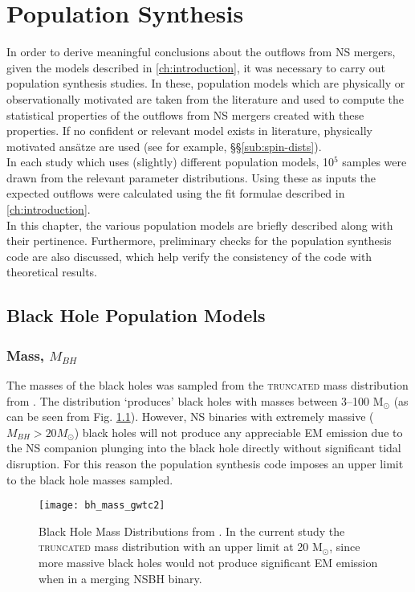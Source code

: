 \chapter{Population Synthesis}\label{ch:synthesis}
    In order to derive meaningful conclusions about the outflows from NS mergers, given
    the models described in \ref{ch:introduction}, it was necessary to carry out
    population synthesis studies. In these, population models which are physically or
    observationally motivated are taken from the literature and used to compute the
    statistical properties of the outflows from NS mergers created with these
    properties. If no confident or relevant model exists in literature, physically
    motivated ans\"{a}tze are used (see for example, \S\S\ref{sub:spin-dists}).\\
    In each study which uses (slightly) different population models, 10$^5$ samples were
    drawn from the relevant parameter distributions. Using these as inputs the expected
    outflows were calculated using the fit formulae described in
    \ref{ch:introduction}.\\
    In this chapter, the various population models are briefly described along with
    their pertinence. Furthermore, preliminary checks for the population synthesis code
    are also discussed, which help verify the consistency of the code with theoretical
    results.

\section{Black Hole Population Models}\label{sec:bh_pop}

    \subsection{Mass, $M_{BH}$}
        The masses of the black holes was sampled from the \textsc{truncated} mass
        distribution from \cite{abbott_2020B}. The distribution `produces' black holes
        with masses between 3--100 M$_\odot$ (as can be seen from Fig.
        \ref{fig:bh_mass_gwtc2}).  However, NS binaries with extremely massive ($M_{BH}
        > 20 M_\odot$) black holes will not produce any appreciable EM emission due to
        the NS companion plunging into the black hole directly without significant tidal
        disruption. For this reason the population synthesis code imposes an upper limit
        to the black hole masses sampled.

        \begin{figure}[H]
            \centering
            \texttt{[image: bh\_mass\_gwtc2]}
            \caption[Black hole mass distributions from GWTC-2]{
                Black Hole Mass Distributions from \cite{abbott_2020B}. In the current
                study the \textsc{truncated} mass distribution with an upper limit at 20
                M$_\odot$, since more massive black holes would not produce significant
                EM emission when in a merging NSBH binary.
            }
            \label{fig:bh_mass_gwtc2}
        \end{figure}


